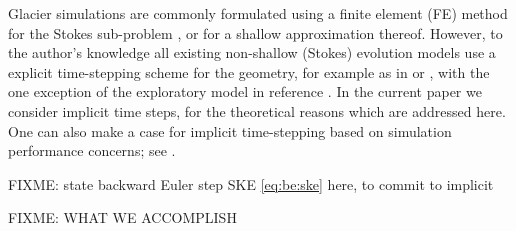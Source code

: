 \documentclass[hidelinks,onefignum,onetabnum,final]{siamart220329}  %
\begin{document}
Glacier simulations are commonly formulated using a finite element (FE) method for the Stokes sub-problem \cite{IsaacStadlerGhattas2015,Jouvetetal2008,Pattynetal2008}, or for a shallow approximation thereof.  However, to the author's knowledge all existing non-shallow (Stokes) evolution models use a explicit time-stepping scheme for the geometry, for example as in \cite{Jouvetetal2008} or \cite{LofgrenAhlkronaHelanow2022}, with the one exception of the exploratory model in reference \cite{WirbelJarosch2020}.  In the current paper we consider implicit time steps, for the theoretical reasons which are addressed here.  One can also make a case for implicit time-stepping based on simulation performance concerns; see \cite{Bueler2023}.

FIXME: state backward Euler step SKE \eqref{eq:be:ske} here, to commit to implicit

FIXME: WHAT WE ACCOMPLISH
\end{document}
